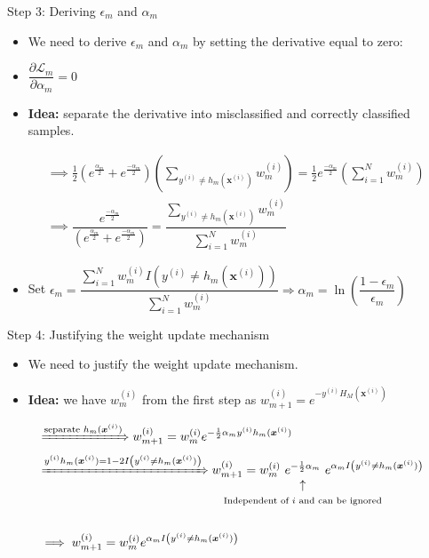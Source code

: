 \documentclass[serif, aspectratio=169]{beamer}
\makeatletter
\newcommand\vertarrowbox[3][6ex]{%
  \begin{array}[t]{@{}c@{}} #2 \\
  \left\uparrow\vcenter{\hrule height #1}\right.\kern-\nulldelimiterspace\\
  \makebox[0pt]{\scriptsize#3}
  \end{array}%
}
\makeatother
\begin{document}
\begin{frame}{Step 3: Deriving $\epsilon_m$ and $\alpha_m$}
    \begin{itemize}
        \itemsep1em
        \justifying
        \item We need to derive $\epsilon_m$ and $\alpha_m$ by setting the derivative equal to zero:
        \item[] \begin{center}
            $\dfrac{\partial \mathcal{L}_m}{\partial \alpha_m} = 0$
        \end{center}
        \item \textbf{Idea:} separate the derivative into misclassified and correctly classified samples.
    \end{itemize}
    \begin{align*}
        &\implies \frac{1}{2} (e^{\frac{\alpha_m}{2}} + e^{\frac{-\alpha_m}{2}}) \left(\displaystyle\sum_{y^{(i)}\neq h_m(\boldsymbol{x}^{(i)})} w_m^{(i)} \right) = \frac{1}{2}e^{\frac{-\alpha_m}{2}} \left(\displaystyle\sum_{i=1}^Nw_m^{(i)} \right) \\
        &\implies \dfrac{e^{\frac{-\alpha_m}{2}}}{(e^{\frac{\alpha_m}{2}} + e^{\frac{-\alpha_m}{2}})} = \dfrac{\sum_{y^{(i)}\neq h_m(\boldsymbol{x}^{(i)})} w_m^{(i)}}{\sum_{i=1}^Nw_m^{(i)}}
    \end{align*}
    \begin{itemize}
        \itemsep1em
        \justifying
        \item Set $\epsilon_m = \dfrac{\sum_{i=1}^N w_m^{(i)}I\left(y^{(i)} \neq h_m(\boldsymbol{x}^{(i)})\right)}{\sum_{i=1}^N w_m^{(i)}} \Longrightarrow \alpha_m = \ln\left(\dfrac{1 - \epsilon_m}{\epsilon_m}\right)$
    \end{itemize}
\end{frame}

\begin{frame}{Step 4: Justifying the weight update mechanism}
    \begin{itemize}
        \itemsep1em
        \justifying
        \item We need to justify the weight update mechanism.
        \item \textbf{Idea:} we have $w_m^{(i)}$ from the first step as $w_{m+1}^{(i)} = e^{-y^{(i)}H_{M}(\boldsymbol{x}^{(i)})}$
    \end{itemize}
    \begin{align*}
        &\xRightarrow{\text{separate } h_m(\boldsymbol{x}^{(i)})}w_{m+1}^{(i)} = w_m^{(i)} e^{-\frac{1}{2}\alpha_my^{(i)}h_m(\boldsymbol{x}^{(i)})} \\
        &\xRightarrow{y^{(i)}h_m(\boldsymbol{x}^{(i)}) = 1 - 2I\left(y^{(i)} \neq h_m(\boldsymbol{x}^{(i)})\right)} w_{m+1}^{(i)} = w_m^{(i)}
        \text{\vertarrowbox[0ex]{\ e^{-\frac{1}{2}\alpha_m}\ }{Independent of $i$ and can be ignored}}
        e^{\alpha_mI\left(y^{(i)} \neq h_m(\boldsymbol{x}^{(i)})\right)} \\ \\
        &\implies w_{m+1}^{(i)} = w_m^{(i)}e^{\alpha_m I\left(y^{(i)} \neq h_m(\boldsymbol{x}^{(i)})\right)}
    \end{align*}
\end{frame}
\end{document}
